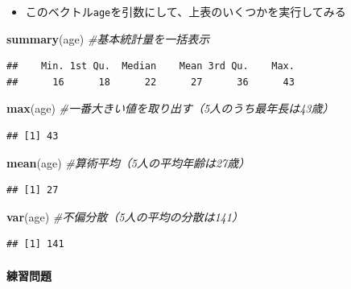 \documentclass[
]{book}
\newenvironment{Shaded}{\begin{snugshade}}{\end{snugshade}}
\newcommand{\CommentTok}[1]{\textcolor[rgb]{0.56,0.35,0.01}{\textit{#1}}}
\newcommand{\FunctionTok}[1]{\textcolor[rgb]{0.13,0.29,0.53}{\textbf{#1}}}
\newcommand{\NormalTok}[1]{#1}
\providecommand{\tightlist}{%
  \setlength{\itemsep}{0pt}\setlength{\parskip}{0pt}}
\begin{document}
\begin{itemize}
\tightlist
\item
  このベクトル\texttt{age}を引数にして、上表のいくつかを実行してみる
\end{itemize}

\begin{Shaded}
\begin{Highlighting}[]
\FunctionTok{summary}\NormalTok{(age) }\CommentTok{\#基本統計量を一括表示}
\end{Highlighting}
\end{Shaded}

\begin{verbatim}
##    Min. 1st Qu.  Median    Mean 3rd Qu.    Max. 
##      16      18      22      27      36      43
\end{verbatim}

\begin{Shaded}
\begin{Highlighting}[]
\FunctionTok{max}\NormalTok{(age) }\CommentTok{\#一番大きい値を取り出す（5人のうち最年長は43歳）}
\end{Highlighting}
\end{Shaded}

\begin{verbatim}
## [1] 43
\end{verbatim}

\begin{Shaded}
\begin{Highlighting}[]
\FunctionTok{mean}\NormalTok{(age) }\CommentTok{\#算術平均（5人の平均年齢は27歳）}
\end{Highlighting}
\end{Shaded}

\begin{verbatim}
## [1] 27
\end{verbatim}

\begin{Shaded}
\begin{Highlighting}[]
\FunctionTok{var}\NormalTok{(age) }\CommentTok{\#不偏分散（5人の平均の分散は141）}
\end{Highlighting}
\end{Shaded}

\begin{verbatim}
## [1] 141
\end{verbatim}

\hypertarget{ux7df4ux7fd2ux554fux984c-4}{%
\paragraph*{練習問題}\label{ux7df4ux7fd2ux554fux984c-4}}
\end{document}
